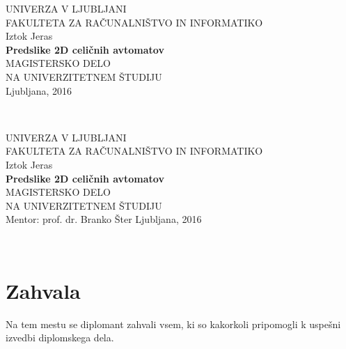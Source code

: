 \documentclass[12pt,a4paper,openany,twoside]{book}
\begin{document}
\thispagestyle{empty} 
\begin{center}
             {\large UNIVERZA V LJUBLJANI\\
                     FAKULTETA ZA RAČUNALNIŠTVO IN INFORMATIKO\\}
\vspace{3cm} {\large Iztok Jeras}\\
\vspace{2cm} {\large \textbf{Predslike 2D celičnih avtomatov}}\\
\vspace{2cm} {MAGISTERSKO DELO\\ NA UNIVERZITETNEM ŠTUDIJU}\\
\vfill       {\Large Ljubljana, 2016}
\end{center}
\newpage
\ \thispagestyle{empty}
\newpage

\thispagestyle{empty} 
\begin{center}
             {\large UNIVERZA V LJUBLJANI\\
                     FAKULTETA ZA RAČUNALNIŠTVO IN INFORMATIKO\\}
\vspace{3cm} {\large Iztok Jeras}\\
\vspace{2cm} {\large \textbf{Predslike 2D celičnih avtomatov}}\\
\vspace{2cm} {MAGISTERSKO DELO\\ NA UNIVERZITETNEM ŠTUDIJU}\\
\vspace{2cm} {\Large Mentor: prof. dr. Branko Šter}
\vfill       {\Large Ljubljana, 2016}
\end{center}
\newpage
\ \thispagestyle{empty}
\newpage


\chapter*{Zahvala}

\thispagestyle{empty}

Na tem mestu se diplomant zahvali vsem, ki so kakorkoli pripomogli k uspešni izvedbi diplomskega dela.
\end{document}
